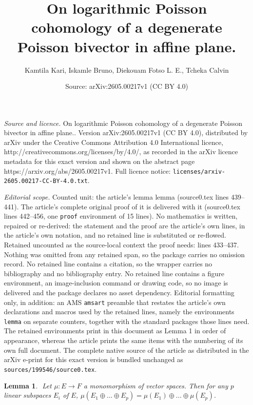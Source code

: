 \documentclass[10pt,a4paper]{amsart}
\title{On logarithmic Poisson cohomology of a degenerate Poisson bivector in affine plane.}
\author{Kamtila Kari, Iskamle Bruno, Diekouam Fotso L. E., Tcheka Calvin}
\date{Source: arXiv:2605.00217v1 (CC BY 4.0)}
\newtheorem{lemma}{Lemma}
\begin{document}
\maketitle

\noindent\emph{Source and licence.} On logarithmic Poisson cohomology of a degenerate Poisson bivector in affine plane.. Version arXiv:2605.00217v1 (CC BY 4.0), distributed by arXiv under the Creative Commons Attribution 4.0 International licence, http://creativecommons.org/licenses/by/4.0/, as recorded in the arXiv licence metadata for this exact version and shown on the abstract page https://arxiv.org/abs/2605.00217v1. Full licence notice: \texttt{licenses/arxiv-2605.00217-CC-BY-4.0.txt}.\par\smallskip

\noindent\textit{Editorial scope.} Counted unit: the article's lemma lemma (source0.tex lines 439--441). The article's complete original proof of it is delivered with it (source0.tex lines 442--456, one \texttt{proof} environment of 15 lines). No mathematics is written, repaired or re-derived: the statement and the proof are the article's own lines, in the article's own notation, and no retained line is substituted or re-flowed.  Retained uncounted as the source-local context the proof needs: lines 433--437.  Nothing was omitted from any retained span, so the package carries no omission record.  No retained line contains a citation, so the wrapper carries no bibliography and no bibliography entry.  No retained line contains a figure environment, an image-inclusion command or drawing code, so no image is delivered and the package declares no asset dependency.  Editorial formatting only, in addition: an AMS \texttt{amsart} preamble that restates the article's own declarations and macros used by the retained lines, namely the environments \texttt{lemma} on separate counters, together with the standard packages those lines need.  The retained environments print in this document as Lemma 1 in order of appearance, whereas the article prints the same items with the numbering of its own full document.  The complete native source of the article as distributed in the arXiv e-print for this exact version is bundled unchanged as \texttt{sources/199546/source0.tex}.
             \begin{lemma} $\label{(3)}$
             Let $\mu: E\longrightarrow F $ a monomorphism of vector spaces. Then for any $p$ linear  subspaces $E_{i}$ of $E$,
          $\mu(E_{1}\oplus...\oplus E_{p})= \mu (E_{1})\oplus...\oplus\mu ( E_{p})$.
             \end{lemma}
\end{document}
